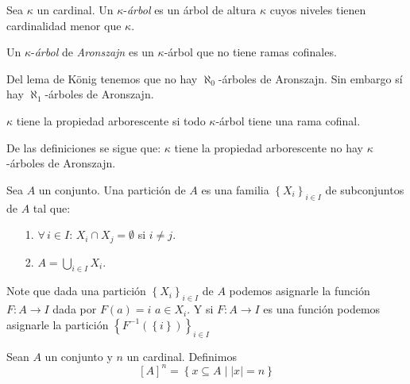 \begin{definicion}
	Sea $\kappa$ un cardinal. Un $\kappa$-\textit{árbol} es un árbol de altura $\kappa$ cuyos niveles tienen cardinalidad menor que $\kappa$.
\end{definicion}

\begin{definicion}
	Un $\kappa$-\textit{árbol} de \textit{Aronszajn} es un $\kappa$-árbol que no tiene ramas cofinales. 
\end{definicion}

\begin{nota}
	Del lema de König tenemos que no hay $\aleph_{\scriptscriptstyle 0}$-árboles de Aronszajn. Sin embargo sí hay $\aleph_{\scriptscriptstyle 1}$-árboles de Aronszajn.
\end{nota} 

\begin{definicion}
	$\kappa$ tiene la propiedad arborescente si todo $\kappa$-árbol tiene una rama cofinal. 
\end{definicion} 

\begin{nota}
	De las definiciones se sigue que: $\kappa$ tiene la propiedad arborescente \sii no hay $\kappa$-árboles de Aronszajn.
\end{nota}

\begin{definicion}
	Sea $A$ un conjunto. Una partición de $A$ es una familia $\left\lbrace X_{i} \right\rbrace_{i\in I}$ de subconjuntos de $A$ tal que:
	\begin{itemize}
		\item[1.] $\forall \, i\in I:\, X_{i} \cap X_{j} = \emptyset$ si $i\neq j$.
		\item[2.] $A = \displaystyle \bigcup_{i\in I} X_{i}$.
	\end{itemize}
\end{definicion}

Note que dada una partición $\left\lbrace X_{i} \right\rbrace_{i\in I}$ de $A$ podemos asignarle la función $F: A \longrightarrow I$ dada por $F(a) = i$ \sii $a\in X_{i}$. Y si $F:A \longrightarrow I$ es una función podemos asignarle la partición $\left\lbrace F^{-1}(\left\lbrace i \right\rbrace ) \right\rbrace_{i\in I}$

\begin{definicion}
	Sean $A$ un conjunto y $n$ un cardinal. Definimos
	$$\left[ A\right]^{n} = \left\lbrace x\subseteq A \mid \left| x \right|  = n \right\rbrace $$
\end{definicion}

